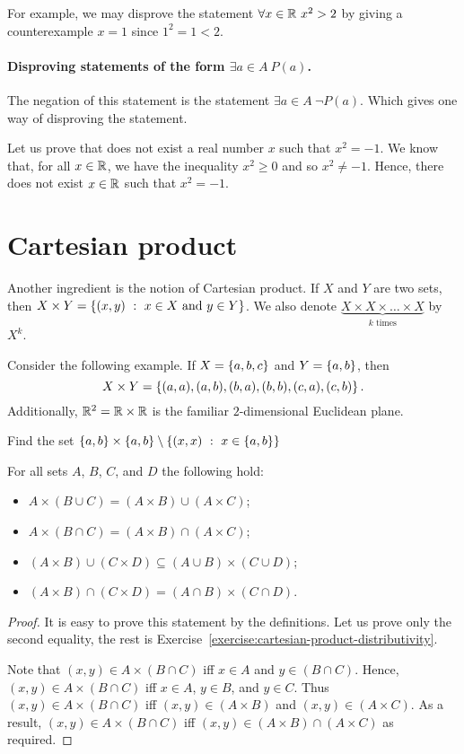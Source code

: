 For example, we may disprove the statement $\forall x \in \mathbb{R} \ x^2 > 2$ by
giving a counterexample $x = 1$ since $1^2 = 1 < 2$.

\paragraph{Disproving statements of the form $\exists a \in A \ P(a)$.}
The negation of this statement is the statement $\exists a \in A \ \lnot P(a)$.
Which gives one way of disproving the statement.

Let us prove that does not exist a real number $x$ such that $x^2 = -1$. We
know that, for all $x \in \mathbb{R}$, we have the inequality $x^2 \ge 0$ and so $x^2
\neq -1$. Hence, there does not exist $x \in \mathbb{R}$ such that $x^2 = -1$.

\section{Cartesian product}
Another ingredient is the notion of Cartesian product. If $X$ and $Y$ are two
sets, then $X \times Y = \set[x \in X \text{ and } y \in Y]{(x, y)}$. We also
denote $\underbrace{X \times X \times \dots \times X}_{k \text{ times}}$ by 
$X^k$.

Consider the following example. If $X = \set{a, b, c}$ and $Y = \set{a, b}$,
then $$X \times Y = \set{(a, a), (a, b), (b, a), (b, b), (c, a), (c, b)}.$$
Additionally, $\mathbb{R}^2 = \mathbb{R} \times \mathbb{R}$ is the familiar $2$-dimensional Euclidean
plane.

\begin{exercise}
  Find the set $\set{a, b} \times \set{a, b} \setminus
  \set[x \in \set{a, b}]{(x, x)}$
\end{exercise}

\begin{theorem}
\label{theorem:cartesian-product-distributivity}
  For all sets $A$, $B$, $C$, and $D$ the following hold:
  \begin{itemize}
    \item $A \times (B \cup C) = (A \times B) \cup (A \times C)$;
    \item $A \times (B \cap C) = (A \times B) \cap (A \times C)$;
    \item $(A \times B) \cup (C \times D) \subseteq
      (A \cup B) \times (C \cup D)$;
    \item $(A \times B) \cap (C \times D) =
      (A \cap B) \times (C \cap D)$.
  \end{itemize}
\end{theorem}
\begin{proof}
  It is easy to prove this statement by the definitions. Let us prove only the
  second equality, the rest is
  Exercise~\ref{exercise:cartesian-product-distributivity}.

  Note that $(x, y) \in A \times (B \cap C)$ iff $x \in A$ and
  $y \in (B \cap C)$.
  Hence, $(x, y) \in A \times (B \cap C)$ iff $x \in A$, $y \in B$, and
  $y \in C$. Thus $(x, y) \in A \times (B \cap C)$ iff
  $(x, y) \in (A \times B)$ and $(x, y) \in (A \times C)$. As a result,
  $(x, y) \in A \times (B \cap C)$ iff
  $(x, y) \in (A \times B) \cap (A \times C)$ as required.
\end{proof}



